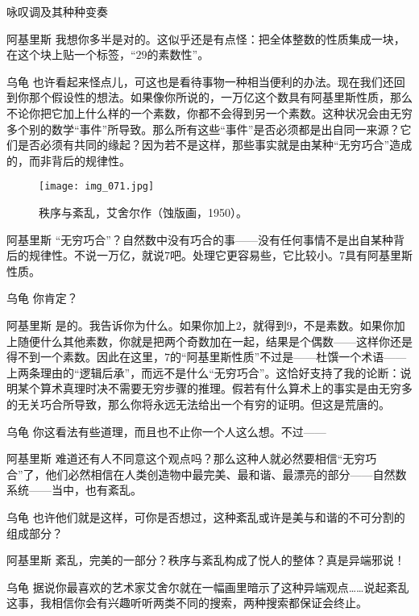 \begin{dialog}{咏叹调及其种种变奏}
\begin{dialogue}
\item[阿基里斯]我想你多半是对的。这似乎还是有点怪：把全体整数的性质集成一块，在这个块上贴一个标签，“$29$的素数性”。

\item[乌龟]也许看起来怪点儿，可这也是看待事物一种相当便利的办法。现在我们还回到你那个假设性的想法。如果像你所说的，一万亿这个数具有阿基里斯性质，那么不论你把它加上什么样的一个素数，你都不会得到另一个素数。这种状况会由无穷多个别的数学“事件”所导致。那么所有这些“事件”是否必须都是出自同一来源？它们是否必须有共同的缘起？因为若不是这样，那些事实就是由某种“无穷巧合”造成的，而非背后的规律性。

\begin{figure}
\texttt{[image: img\_071.jpg]}
\caption[秩序与紊乱，艾舍尔作。]
  {秩序与紊乱，艾舍尔作（蚀版画，1950）。}
\end{figure}

\item[阿基里斯]“无穷巧合”？自然数中没有巧合的事——没有任何事情不是出自某种背后的规律性。不说一万亿，就说7吧。处理它更容易些，它比较小。7具有阿基里斯性质。

\item[乌龟]你肯定？

\item[阿基里斯]是的。我告诉你为什么。如果你加上$2$，就得到$9$，不是素数。如果你加上随便什么其他素数，你就是把两个奇数加在一起，结果是个偶数——这样你还是得不到一个素数。因此在这里，$7$的“阿基里斯性质”不过是——杜馔一个术语——上两条理由的“逻辑后承”，而远不是什么“无穷巧合”。这恰好支持了我的论断：说明某个算术真理时决不需要无穷步骤的推理。假若有什么算术上的事实是由无穷多的无关巧合所导致，那么你将永远无法给出一个有穷的证明。但这是荒唐的。

\item[乌龟]你这看法有些道理，而且也不止你一个人这么想。不过——

\item[阿基里斯]难道还有人不同意这个观点吗？那么这种人就必然要相信“无穷巧合”了，他们必然相信在人类创造物中最完美、最和谐、最漂亮的部分——自然数系统——当中，也有紊乱。

\item[乌龟]也许他们就是这样，可你是否想过，这种紊乱或许是美与和谐的不可分割的组成部分？

\item[阿基里斯]紊乱，完美的一部分？秩序与紊乱构成了悦人的整体？真是异端邪说！

\item[乌龟]据说你最喜欢的艺术家艾舍尔就在一幅画里暗示了这种异端观点……说起紊乱这事，我相信你会有兴趣听听两类不同的搜索，两种搜索都保证会终止。


\end{dialogue}
\end{dialog}
